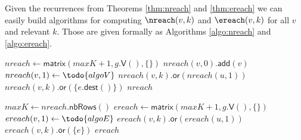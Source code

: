 Given the recurrences from Theorems \ref{thm:nreach} and \ref{thm:ereach} we can easily build algorithms
for computing $\nreach(v, k)$ and $\ereach(v, k)$ for all $v$ and relevant $k$. Those are given formally as
Algorithms \ref{algo:nreach} and \ref{algo:ereach}.

\begin{algorithm}[t]
\small
\caption{$\textsf{compute-n-reach}\left( g, maxK \right)$}
\begin{algorithmic}[1]
\STATE $nreach \gets \textsf{matrix}(maxK + 1, g.\textsf{V}(), \{ \} )$
  \STATE $nreach(v, 0).\textsf{add}(v)$
\ENDFOR
{}
  \STATE $nreach(v, 1) \gets \todo{algoV}$
\ENDFOR
{}
      \STATE $nreach(v, k).\textsf{or}(nreach(u, 1))$
    \ENDFOR
        \STATE $nreach(v, k).\textsf{or}(\{ e.\textsf{dest}()\})$
      \ENDFOR
    \ENDFOR
  \ENDFOR
\ENDFOR
\RETURN $nreach$
\end{algorithmic}
\label{algo:nreach}
\end{algorithm}

\begin{algorithm}[t]
\small
\caption{$\textsf{compute-e-reach}\left( g, nreach \right)$}
\begin{algorithmic}[1]
\STATE $maxK \gets nreach.\textsf{nbRows}()$
\STATE $ereach \gets \textsf{matrix}(maxK + 1, g.\textsf{V}(), \{ \} )$
  \STATE $ereach(v, 1) \gets \todo{algoE}$
\ENDFOR
{}
      \STATE $ereach(v, k).\textsf{or}(ereach(u, 1))$
    \ENDFOR
        \STATE $ereach(v, k).\textsf{or}(\{ e \})$
      \ENDFOR
    \ENDFOR
  \ENDFOR
\ENDFOR
\RETURN $ereach$
\end{algorithmic}
\label{algo:ereach}
\end{algorithm}


